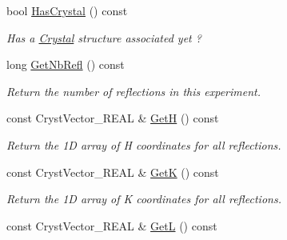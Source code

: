 \begin{DoxyCompactItemize}
\mbox{\label{class_obj_cryst_1_1_scattering_data_a8002a6aa68156df44e23bc3cc424fbda}} 
bool \mbox{\hyperlink{class_obj_cryst_1_1_scattering_data_a8002a6aa68156df44e23bc3cc424fbda}{Has\+Crystal}} () const
\begin{DoxyCompactList}\small\item\em Has a \mbox{\hyperlink{class_obj_cryst_1_1_crystal}{Crystal}} structure associated yet ? \end{DoxyCompactList}\item 
\mbox{\label{class_obj_cryst_1_1_scattering_data_aec92465bb5615b797a1e17a796235840}} 
long \mbox{\hyperlink{class_obj_cryst_1_1_scattering_data_aec92465bb5615b797a1e17a796235840}{Get\+Nb\+Refl}} () const
\begin{DoxyCompactList}\small\item\em Return the number of reflections in this experiment. \end{DoxyCompactList}\item 
\mbox{\label{class_obj_cryst_1_1_scattering_data_a6f112d90257266103774cdcdecd3e31a}} 
const Cryst\+Vector\+\_\+\+R\+E\+AL \& \mbox{\hyperlink{class_obj_cryst_1_1_scattering_data_a6f112d90257266103774cdcdecd3e31a}{GetH}} () const
\begin{DoxyCompactList}\small\item\em Return the 1D array of H coordinates for all reflections. \end{DoxyCompactList}\item 
\mbox{\label{class_obj_cryst_1_1_scattering_data_a364c421b607fcc17d8ff5b2522d87d04}} 
const Cryst\+Vector\+\_\+\+R\+E\+AL \& \mbox{\hyperlink{class_obj_cryst_1_1_scattering_data_a364c421b607fcc17d8ff5b2522d87d04}{GetK}} () const
\begin{DoxyCompactList}\small\item\em Return the 1D array of K coordinates for all reflections. \end{DoxyCompactList}\item 
\mbox{\label{class_obj_cryst_1_1_scattering_data_aa49d99de3d1475b3b845d459194cc277}} 
const Cryst\+Vector\+\_\+\+R\+E\+AL \& \mbox{\hyperlink{class_obj_cryst_1_1_scattering_data_aa49d99de3d1475b3b845d459194cc277}{GetL}} () const

\end{DoxyCompactItemize}

